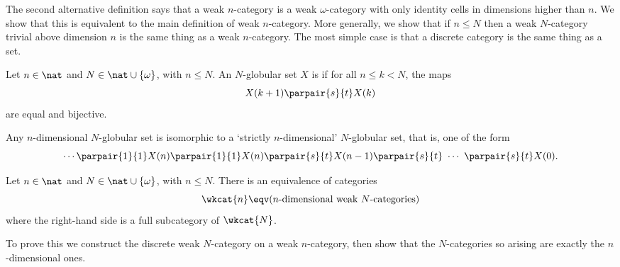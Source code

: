 The second alternative definition says that a weak $n$-category is a weak
$\omega$-category with only identity cells in dimensions higher than $n$.
We show that this is equivalent to the main definition of weak
$n$-category.  More generally, we show that if $n \leq N$ then a weak
$N$-category trivial above dimension $n$ is the same thing as a weak
$n$-category.  The most simple case is that a discrete category is the same
thing as a set.

\begin{defn}
Let $n\in\nat$ and $N\in \nat\cup \{\omega\}$, with $n\leq N$.  An
$N$-globular set $X$ is %
%
%
if for all $n\leq k < N$,
the maps
\[
X(k+1) \parpair{s}{t} X(k)
\]
are equal and bijective.
\end{defn}
% 
Any $n$-dimensional $N$-globular set is isomorphic to a `strictly
$n$-dimensional' $N$-globular set, that is, one of the form
%
\begin{equation}	\label{diag:disc-glob-set}
\cdots
\parpair{1}{1}
X(n)
\parpair{1}{1}
X(n)
\parpair{s}{t}
X(n-1)
\parpair{s}{t}
\ 
\cdots
\ 
\parpair{s}{t}
X(0).
\end{equation}

\begin{thm}	
Let $n\in\nat$ and $N\in \nat\cup \{\omega\}$, with $n\leq N$.  There
is an equivalence of categories
\[
\wkcat{n}
\eqv
(n \textup{-dimensional weak } N \textup{-categories})
\]
where the right-hand side is a full subcategory of $\wkcat{N}$.
\end{thm}
% 
To prove this we construct the discrete weak $N$-category on a weak
$n$-category, then show that the $N$-categories so arising are exactly the
$n$-dimensional ones.

